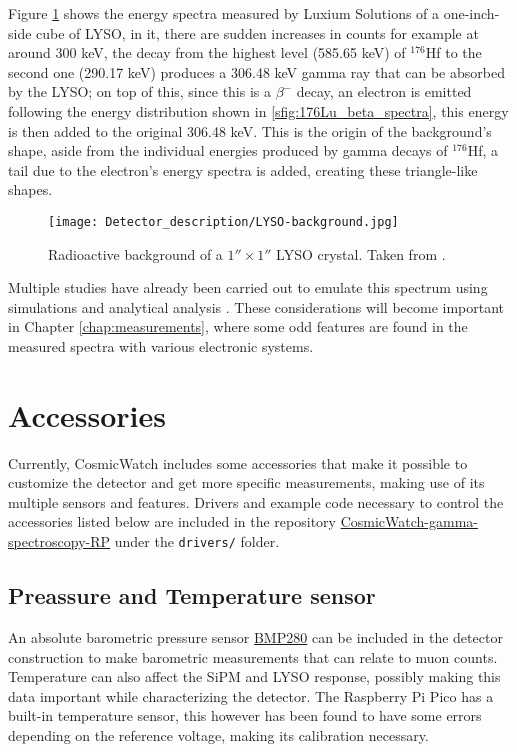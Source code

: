 Figure \ref{fig:LYSO_background} shows the energy spectra measured by Luxium Solutions of a one-inch-side cube of LYSO, in it, there are sudden increases in counts for example at around 300 keV, the decay from the highest level (585.65 keV) of $^{176}$Hf to the second one (290.17 keV) produces a 306.48 keV gamma ray that can be absorbed by the LYSO; on top of this, since this is a $\beta^{-}$ decay, an electron is emitted following the energy distribution shown in \ref{sfig:176Lu_beta_spectra}, this energy is then added to the original 306.48 keV. This is the origin of the background's shape, aside from the individual energies produced by gamma decays of $^{176}$Hf, a tail due to the electron's energy spectra is added, creating these triangle-like shapes.

\begin{figure}[H]
  \centering
  \texttt{[image: Detector\_description/LYSO-background.jpg]}
  \caption{Radioactive background of a $1''\times1''$ LYSO crystal. Taken from \cite{Luxium_LYSO}.}
  \label{fig:LYSO_background}
\end{figure}

Multiple studies have already been carried out to emulate this spectrum using simulations and analytical analysis \cite{LYSO_background,LYSO_background_Geant4}. These considerations will become important in Chapter \ref{chap:measurements}, where some odd features are found in the measured spectra with various electronic systems.

\section{Accessories}

Currently, CosmicWatch includes some accessories that make it possible to customize the detector and get more specific measurements, making use of its multiple sensors and features. Drivers and example code necessary to control the accessories listed below are included in the repository \href{https://github.com/anvargasl/CosmicWatch-gamma-spectroscopy-RP}{CosmicWatch-gamma-spectroscopy-RP} under the \texttt{drivers/} folder.

\subsection{Preassure and Temperature sensor}

An absolute barometric pressure sensor \href{https://www.bosch-sensortec.com/products/environmental-sensors/pressure-sensors/bmp280/}{BMP280} can be included in the detector construction to make barometric measurements that can relate to muon counts. Temperature can also affect the SiPM and LYSO response, possibly making this data important while characterizing the detector. The Raspberry Pi Pico has a built-in temperature sensor, this however has been found to have some errors depending on the reference voltage, making its calibration necessary.

